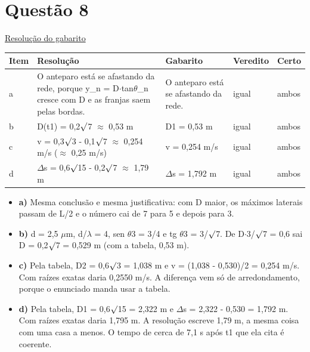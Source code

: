 \documentclass{article}%
\begin{document}
\section*{Questão 8}%
\href{https://poliedroresolve.sistemapoliedro.com.br/vestibulares/ime/2027/ime-2-fase-dia-2-27-10-2026-2-fase-dia-2/dissertativa-8-fisica-2-fase-dia-2-ime-2027}{Resolução do gabarito}\par\smallskip%
\begin{longtable}{@{}p{} p{} p{} p{} p{}@{}}\toprule Item & Resolução & Gabarito & Veredito & Certo \\ \midrule
a & O anteparo está se afastando da rede, porque y\_n = D$\cdot$tan$\theta$\_n cresce com D e as franjas saem pelas bordas. & O anteparo está se afastando da rede. & igual & ambos \\
b & D(t1) = 0,2$\surd$7 $\approx$ 0,53 m & D1 = 0,53 m & igual & ambos \\
c & v = 0,3$\surd$3 - 0,1$\surd$7 $\approx$ 0,254 m/s ($\approx$ 0,25 m/s) & v = 0,254 m/s & igual & ambos \\
d & $\Delta$s = 0,6$\surd$15 - 0,2$\surd$7 $\approx$ 1,79 m & $\Delta$s = 1,792 m & igual & ambos \\
\bottomrule\end{longtable}%
\begin{itemize}%
\item%
\textbf{a)} Mesma conclusão e mesma justificativa: com D maior, os máximos laterais passam de L/2 e o número cai de 7 para 5 e depois para 3.%
\item%
\textbf{b)} d = 2,5 $\mu$m, d/$\lambda$ = 4, sen $\theta$3 = 3/4 e tg $\theta$3 = 3/$\surd$7. De D$\cdot$3/$\surd$7 = 0,6 sai D = 0,2$\surd$7 = 0,529 m (com a tabela, 0,53 m).%
\item%
\textbf{c)} Pela tabela, D2 = 0,6$\surd$3 = 1,038 m e v = (1,038 - 0,530)/2 = 0,254 m/s. Com raízes exatas daria 0,2550 m/s. A diferença vem só de arredondamento, porque o enunciado manda usar a tabela.%
\item%
\textbf{d)} Pela tabela, D1 = 0,6$\surd$15 = 2,322 m e $\Delta$s = 2,322 - 0,530 = 1,792 m. Com raízes exatas daria 1,795 m. A resolução escreve 1,79 m, a mesma coisa com uma casa a menos. O tempo de cerca de 7,1 s após t1 que ela cita é coerente.%
\end{itemize}%
\end{document}
